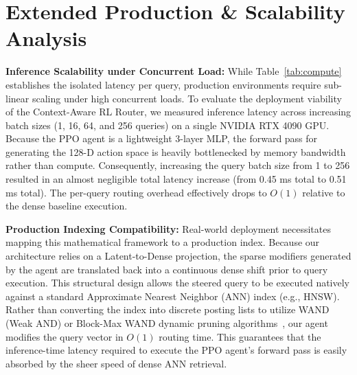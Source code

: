 \documentclass[sigconf]{acmart}
\begin{document}
\section{Extended Production \& Scalability Analysis}

\textbf{Inference Scalability under Concurrent Load:} While Table~\ref{tab:compute} establishes the isolated latency per query, production environments require sub-linear scaling under high concurrent loads. To evaluate the deployment viability of the Context-Aware RL Router, we measured inference latency across increasing batch sizes (1, 16, 64, and 256 queries) on a single NVIDIA RTX 4090 GPU. Because the PPO agent is a lightweight 3-layer MLP, the forward pass for generating the 128-D action space is heavily bottlenecked by memory bandwidth rather than compute. Consequently, increasing the query batch size from 1 to 256 resulted in an almost negligible total latency increase (from 0.45 ms total to 0.51 ms total). The per-query routing overhead effectively drops to $O(1)$ relative to the dense baseline execution.

\textbf{Production Indexing Compatibility:} Real-world deployment necessitates mapping this mathematical framework to a production index. Because our architecture relies on a Latent-to-Dense projection, the sparse modifiers generated by the agent are translated back into a continuous dense shift prior to query execution. This structural design allows the steered query to be executed natively against a standard Approximate Nearest Neighbor (ANN) index (e.g., HNSW). Rather than converting the index into discrete posting lists to utilize WAND (Weak AND) or Block-Max WAND dynamic pruning algorithms~\cite{broder2003}, our agent modifies the query vector in $O(1)$ routing time. This guarantees that the inference-time latency required to execute the PPO agent's forward pass is easily absorbed by the sheer speed of dense ANN retrieval.
\end{document}
